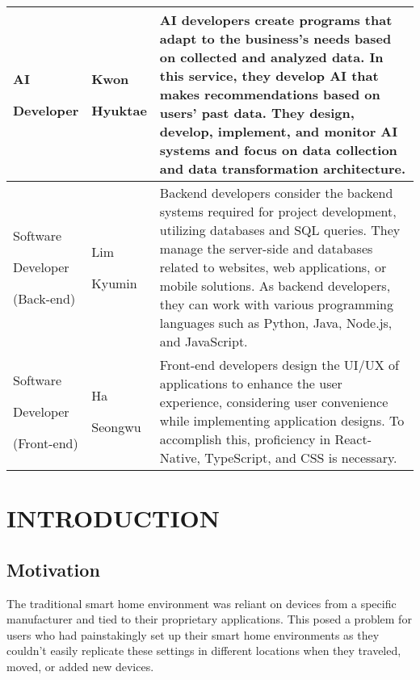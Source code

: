 \documentclass[conference]{IEEEtran}
\begin{document}
\begin{table}
\def\arraystretch{1.24} \small
    \begin{tabular}{|p{1.8cm}|p{1.4cm}|p{4.4cm}|}
        \hline
        AI \par Developer & Kwon \par Hyuktae  & AI developers create programs that adapt to the business's needs based on collected and analyzed data. In this service, they develop AI that makes recommendations based on users' past data. They design, develop, implement, and monitor AI systems and focus on data collection and data transformation architecture. \\ \hline
        
        Software \par Developer \par(Back-end) & Lim \par Kyumin & Backend developers consider the backend systems required for project development, utilizing databases and SQL queries. They manage the server-side and databases related to websites, web applications, or mobile solutions. As backend developers, they can work with various programming languages such as Python, Java, Node.js, and JavaScript. \\ \hline
        
       Software \par Developer\par(Front-end) & Ha \par Seongwu & Front-end developers design the UI/UX of applications to enhance the user experience, considering user convenience while implementing application designs. To accomplish this, proficiency in React-Native, TypeScript, and CSS is necessary.
 \\ \hline
    \end{tabular}
\end{table}


\section{INTRODUCTION}

\subsection{Motivation}
The traditional smart home environment was reliant on devices from a specific manufacturer and tied to their proprietary applications. This posed a problem for users who had painstakingly set up their smart home environments as they couldn't easily replicate these settings in different locations when they traveled, moved, or added new devices.
\end{document}

